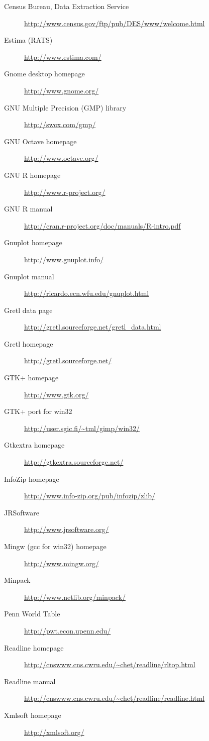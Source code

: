 \begin{description}

\item[Census Bureau, Data Extraction Service]
  \url{http://www.census.gov/ftp/pub/DES/www/welcome.html}
\item[Estima (RATS)] \url{http://www.estima.com/}
\item[Gnome desktop homepage] \url{http://www.gnome.org/}
\item[GNU Multiple Precision (GMP) library]
  \url{http://swox.com/gmp/}
\item[GNU Octave homepage] \url{http://www.octave.org/}
\item[GNU R homepage] \url{http://www.r-project.org/}
\item[GNU R manual]
  \url{http://cran.r-project.org/doc/manuals/R-intro.pdf}
\item[Gnuplot homepage] \url{http://www.gnuplot.info/}
\item[Gnuplot manual] \url{http://ricardo.ecn.wfu.edu/gnuplot.html}
\item[Gretl data page]
  \url{http://gretl.sourceforge.net/gretl_data.html}
\item[Gretl homepage] \url{http://gretl.sourceforge.net/}
\item[GTK+ homepage] \url{http://www.gtk.org/}
\item[GTK+ port for win32]
  \url{http://user.sgic.fi/~tml/gimp/win32/}
\item[Gtkextra homepage] \url{http://gtkextra.sourceforge.net/}
\item[InfoZip homepage]
  \url{http://www.info-zip.org/pub/infozip/zlib/}
\item[JRSoftware] \url{http://www.jrsoftware.org/}
\item[Mingw (gcc for win32) homepage] \url{http://www.mingw.org/}
\item[Minpack] \url{http://www.netlib.org/minpack/}
\item[Penn World Table] \url{http://pwt.econ.upenn.edu/}
\item[Readline homepage]
  \url{http://cnswww.cns.cwru.edu/~chet/readline/rltop.html}
\item[Readline manual]
  \url{http://cnswww.cns.cwru.edu/~chet/readline/readline.html}
\item[Xmlsoft homepage] \url{http://xmlsoft.org/}

\end{description}



